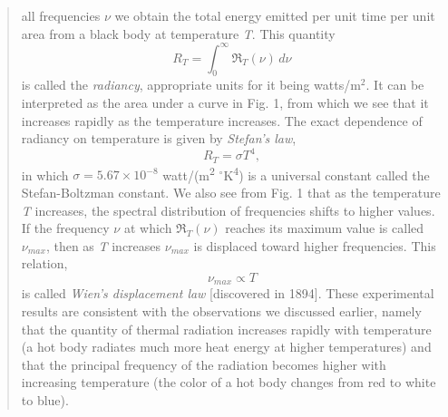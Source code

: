 \begin{quotation}
all frequencies $\nu$ we obtain the total energy emitted per unit
time per unit area from a black body at temperature \emph{T}. This
quantity
%
\begin{equation}
R_T = \int_{0}^{\infty}\! \Re_T(\nu)\, d\nu
\end{equation}
%
is called the \emph{radiancy}, appropriate units for it being
watts/m$^2$. It can be interpreted as the area under a
curve in Fig. 1, from which we see that it increases rapidly as the
temperature increases. The exact dependence of radiancy on temperature
is given by \emph{Stefan's law},
%
\begin{equation}
R_T = \sigma T^{4},
\end{equation}
%
in which $\sigma = 5.67 \times 10^{-8}$ watt/(m\textsuperscript{2} $^\circ$K\textsuperscript{4}) is a universal
constant called the Stefan-Boltzman constant. We also see from Fig. 1
that as the temperature \emph{T} increases, the spectral distribution of
frequencies shifts to higher values. If the frequency $\nu$ at which
$\Re_T(\nu)$ reaches its maximum value is called
$\nu_{max}$, then as \emph{T} increases
$\nu_{max}$ is displaced toward higher frequencies. This
relation,
%
\begin{equation}\label{eq:planck_3}%
\nu_{max} \propto T
\end{equation}
%
is called \emph{Wien's displacement law} {[}discovered in 1894{]}. These
experimental results are consistent with the observations we discussed
earlier, namely that the quantity of thermal radiation increases rapidly
with temperature (a hot body radiates much more heat energy at higher
temperatures) and that the principal frequency of the radiation becomes
higher with increasing temperature (the color of a hot body changes from
red to white to blue).


\end{quotation}
